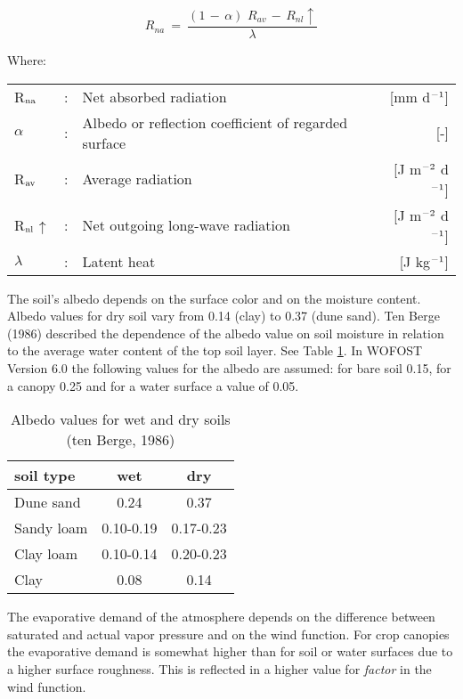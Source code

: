 \begin{equation}
\label{eq:AbsGlobRad}
R _{na} ~=~{\frac{(1\, -\, \alpha )\,\, R _{av} \, -\, R _{nl} \uparrow  }{\lambda}}
\end{equation}


Where:\\[5pt]
\begin{tabularx}{\textwidth}{llXr}
	R$_{{\rm na}}$ &:& Net absorbed radiation  & [mm d$^{{\rm -1}}$]\\
	$\alpha$ &:& Albedo or reflection coefficient of regarded surface  & [-]\\
	R$_{{\rm av}}$ &:& Average radiation  & [J m$^{{\rm -2}}$ d$^{{\rm -1}}$]\\
	R$_{{\rm nl}}$$\uparrow$ &:& Net outgoing long-wave radiation  & [J m$^{{\rm -2}}$ d$^{{\rm -1}}$]\\
	$\lambda$ &:& Latent heat  & [J kg$^{{\rm -1}}$]\\
\end{tabularx}


The soil's albedo depends on the surface color and on the moisture content. Albedo
values for dry soil vary from 0.14 (clay) to 0.37 (dune sand). Ten Berge (1986) described
the depen\-dence of the albedo value on soil moisture in relation to the average water
content of the top soil layer. See Table \ref{tab:AlbedoSoils}. 
In WOFOST Version 6.0 the following values for the albedo are assumed: for bare soil
0.15, for a canopy  0.25 and for a water surface a value of 0.05.

\begin{table}
	\centering
	\caption{Albedo values for wet and dry soils (ten Berge, 1986)}
	\label{tab:AlbedoSoils}
	\begin{tabular}{lcc}
		\hline
		soil type & wet & dry\\
		\hline
		Dune sand  &   0.24 &  0.37 \\
		Sandy loam &    0.10-0.19 &  0.17-0.23\\
		Clay loam &    0.10-0.14 &  0.20-0.23\\
		Clay &    0.08 &  0.14\\
		\hline
	\end{tabular}
\end{table}

The evaporative demand of the atmosphere depends on the difference between saturated
and actual vapor pressure and on the wind function. For crop canopies the evaporative
demand is somewhat higher than for soil or water surfaces due to a higher surface
roughness. This is reflected in a higher value for {\it factor} in the wind function.

